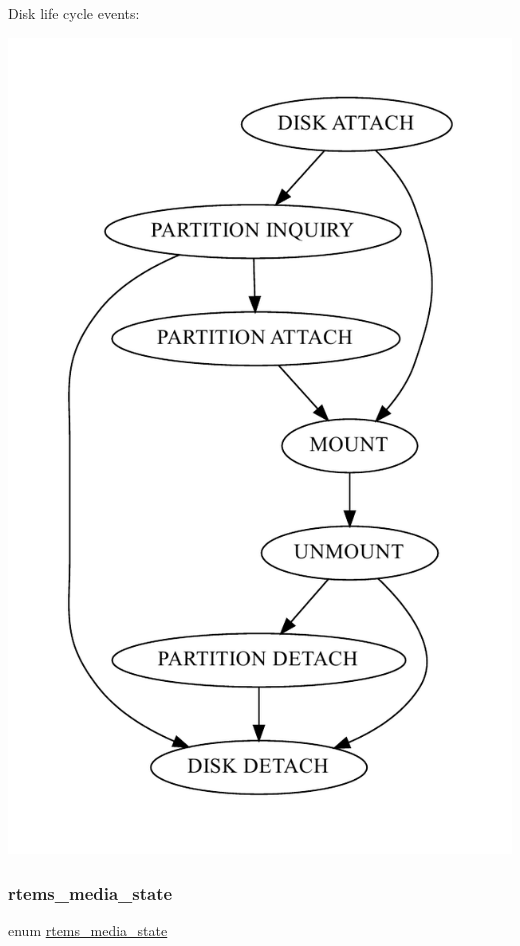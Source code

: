 Disk life cycle events\+: 
\begin{DoxyImageNoCaption}
  \mbox{\includegraphics[width=\textwidth,height=\textheight/2,keepaspectratio=true]{dot_inline_dotgraph_2}}
\end{DoxyImageNoCaption}
 \mbox{\label{group__RTEMSIOMedia_gaaec542a8c74e36e4edf774f2313fcd7c}} 
\subsubsection{\texorpdfstring{rtems\_media\_state}{rtems\_media\_state}}
{\footnotesize\ttfamily enum \mbox{\hyperlink{group__RTEMSIOMedia_gaaec542a8c74e36e4edf774f2313fcd7c}{rtems\+\_\+media\+\_\+state}}}


